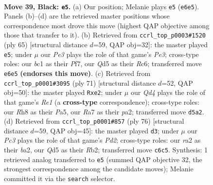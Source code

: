 \documentclass[11pt]{article}
\begin{document}
\clearpage

\begin{figure}[p]\centering
\begin{subfigure}{0.46\textwidth}\centering
\resizebox{\linewidth}{!}{%
\newchessgame
\chessboard[
  setfen={7r/r3k3/1pp1p1p1/3q2p1/Pp1P4/3KP3/R1Q5/2B5 b - - 1 39},
  showmover=false,
  pgfstyle=straightmove, color=movearrow, markmove={e6-e5}
]}
\caption{}
\end{subfigure}\hfill
\begin{subfigure}{0.46\textwidth}\centering
\resizebox{\linewidth}{!}{%
\newchessgame
\chessboard[
  setfen={8/5pk1/2r1p2p/p1Pq2p1/2R5/P5PP/5P2/2Q3K1 b - - 2 33},
  showmover=false,
  pgfstyle=straightmove, color=movearrow, markmove={e6-e5}
]}
\caption{}
\end{subfigure}
\\[4pt]
\begin{subfigure}{0.46\textwidth}\centering
\resizebox{\linewidth}{!}{%
\newchessgame
\chessboard[
  setfen={4r1k1/5p2/3p4/p2P2p1/5q1p/5P2/P3RQB1/6K1 b - - 1 36},
  showmover=false,
  pgfstyle=straightmove, color=movearrow, markmove={e8-e2}
]}
\caption{}
\end{subfigure}\hfill
\begin{subfigure}{0.46\textwidth}\centering
\resizebox{\linewidth}{!}{%
\newchessgame
\chessboard[
  setfen={3r2k1/4qp2/4p2p/4Q3/2P2P2/1p5P/bR1PB1K1/8 w - - 1 39},
  showmover=false,
  pgfstyle=straightmove, color=movearrow, markmove={d2-d3}
]}
\caption{}
\end{subfigure}
\caption{\textbf{Move 39, Black: \texttt{e5}.} (a) Our position; Melanie plays \texttt{e5} (\texttt{e6e5}). Panels (b)--(d) are the retrieved master positions whose correspondence most drove this move (highest QAP objective among those that transfer to it). (b) Retrieved from \texttt{ccrl\_top\_p0003\#1520} (ply 65) [structural distance $d$=59, QAP obj=32]: the master played \texttt{e5}; under $\mu$ our \emph{Pe3} plays the role of that game's \emph{Pe3}; cross-type roles: our \emph{b}c1 as their \emph{P}f7, our \emph{Q}d5 as their \emph{R}c6; transferred move \texttt{e6e5} \textbf{(endorses this move)}. (c) Retrieved from \texttt{ccrl\_top\_p0001\#3095} (ply 71) [structural distance $d$=52, QAP obj=50]: the master played \texttt{Rxe2}; under $\mu$ our \emph{Qd4} plays the role of that game's \emph{Re1} (a \textbf{cross-type} correspondence); cross-type roles: our \emph{R}h8 as their \emph{P}a5, our \emph{R}a7 as their \emph{p}a2; transferred move \texttt{d5a2}. (d) Retrieved from \texttt{ccrl\_top\_p0001\#857} (ply 76) [structural distance $d$=59, QAP obj=45]: the master played \texttt{d3}; under $\mu$ our \emph{Pc3} plays the role of that game's \emph{Pd2}; cross-type roles: our \emph{r}a2 as their \emph{b}a2, our \emph{Q}d5 as their \emph{R}b2; transferred move \texttt{c6c5}. Synthesis: 1 retrieved analog transferred to \texttt{e5} (summed QAP objective 32, the strongest correspondence among the candidate moves); Melanie committed it via the \texttt{search} selector.}
\label{fig:thought-m77}
\end{figure}
\end{document}
